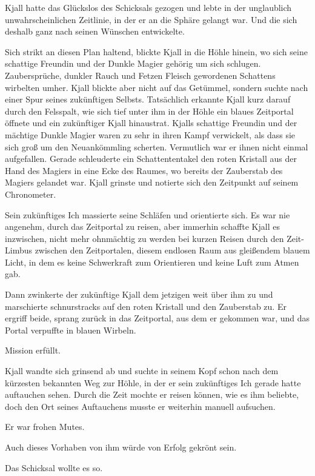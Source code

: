 \documentclass[10pt, a4paper, oneside]{book}
\begin{document}
Kjall hatte das Glückslos des Schicksals gezogen und lebte in der unglaublich unwahrscheinlichen Zeitlinie, in der er an die Sphäre gelangt war. Und die sich deshalb ganz nach seinen Wünschen entwickelte.

Sich strikt an diesen Plan haltend, blickte Kjall in die Höhle hinein, wo sich seine schattige Freundin und der Dunkle Magier gehörig um sich schlugen. Zaubersprüche, dunkler Rauch und Fetzen Fleisch gewordenen Schattens wirbelten umher. Kjall blickte aber nicht auf das Getümmel, sondern suchte nach einer Spur seines zukünftigen Selbsts. Tatsächlich erkannte Kjall kurz darauf durch den Felsspalt, wie sich tief unter ihm in der Höhle ein blaues Zeitportal öffnete und ein zukünftiger Kjall hinaustrat. Kjalls schattige Freundin und der mächtige Dunkle Magier waren zu sehr in ihren Kampf verwickelt, als dass sie sich groß um den Neuankömmling scherten. Vermutlich war er ihnen nicht einmal aufgefallen. Gerade schleuderte ein Schattententakel den roten Kristall aus der Hand des Magiers in eine Ecke des Raumes, wo bereits der Zauberstab des Magiers gelandet war. Kjall grinste und notierte sich den Zeitpunkt auf seinem Chronometer.

Sein zukünftiges Ich massierte seine Schläfen und orientierte sich. Es war nie angenehm, durch das Zeitportal zu reisen, aber immerhin schaffte Kjall es inzwischen, nicht mehr ohnmächtig zu werden bei kurzen Reisen durch den Zeit-Limbus zwischen den Zeitportalen, diesem endlosen Raum aus gleißendem blauem Licht, in dem es keine Schwerkraft zum Orientieren und keine Luft zum Atmen gab.

Dann zwinkerte der zukünftige Kjall dem jetzigen weit über ihm zu und marschierte schnurstracks auf den roten Kristall und den Zauberstab zu. Er ergriff beide, sprang zurück in das Zeitportal, aus dem er gekommen war, und das Portal verpuffte in blauen Wirbeln.

Mission erfüllt.

Kjall wandte sich grinsend ab und suchte in seinem Kopf schon nach dem kürzesten bekannten Weg zur Höhle, in der er sein zukünftiges Ich gerade hatte auftauchen sehen. Durch die Zeit mochte er reisen können, wie es ihm beliebte, doch den Ort seines Auftauchens musste er weiterhin manuell aufsuchen.

Er war frohen Mutes.

Auch dieses Vorhaben von ihm würde von Erfolg gekrönt sein.

Das Schicksal wollte es so.\bigskip
\end{document}
